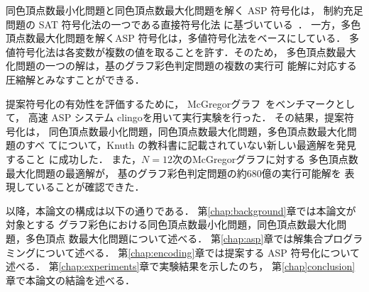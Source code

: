 同色頂点数最小化問題と同色頂点数最大化問題を解く ASP 符号化は，
制約充足問題の SAT 符号化法の一つである直接符号化法
に基づいている~\cite{JSAI:TamuraTB10}．
一方，多色頂点数最大化問題を解くASP 符号化は，多値符号化法をベースにしている．
多値符号化法は各変数が複数の値を取ることを許す．そのため，
多色頂点数最大化問題の一つの解は，基のグラフ彩色判定問題の複数の実行可
能解に対応する圧縮解とみなすことができる．

提案符号化の有効性を評価するために，
\textsf{McGregor}グラフ~\cite{Knuth:TAOCP:SAT}をベンチマークとして，
高速 ASP システム \textsf{clingo}を用いて実行実験を行った．
その結果，提案符号化は，
同色頂点数最小化問題，同色頂点数最大化問題，多色頂点数最大化問題のすべ
てについて，Knuth の教科書に記載されていない新しい最適解を発見すること
に成功した．
また，$N=12$次の\textsf{McGregor}グラフに対する
多色頂点数最大化問題の最適解が，
基のグラフ彩色判定問題の約680億の実行可能解を
表現していることが確認できた．




以降，本論文の構成は以下の通りである．
第\ref{chap:background}章では本論文が対象とする
グラフ彩色における同色頂点数最小化問題，同色頂点数最大化問題，多色頂点
数最大化問題について述べる．
第\ref{chap:asp}章では解集合プログラミングについて述べる．
第\ref{chap:encoding}章では提案する ASP 符号化について述べる．
第\ref{chap:experiments}章で実験結果を示したのち，
第\ref{chap]conclusion}章で本論文の結論を述べる．


